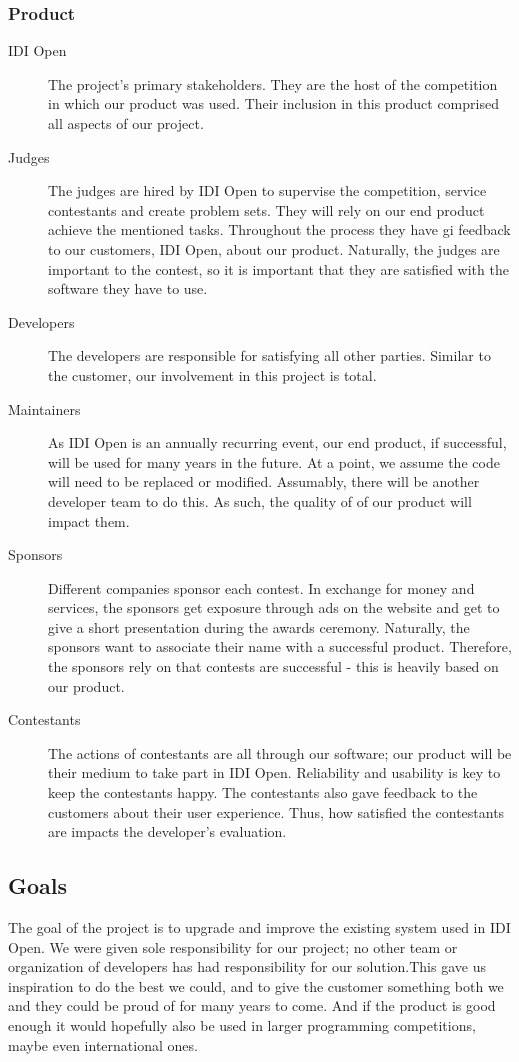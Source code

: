 \subsubsection{Product}
\begin{description}
\item[IDI Open]
The project's primary stakeholders. They are the host of
the competition in which our product was used. Their inclusion in this
product comprised all aspects of our project.

\item[Judges]
The judges are hired by IDI Open to supervise the competition, service
contestants and create problem sets. They will rely on our end product
achieve the mentioned tasks. Throughout the process they have gi\ven
feedback to our customers, IDI Open, about our product. Naturally, the
judges are important to the contest, so it is important that they are
satisfied with the software they have to use.

\item[Developers]
The developers are responsible for satisfying all other parties. Similar
to the customer, our involvement in this project is total.

\item[Maintainers]
As IDI Open is an annually recurring event, our end product, if
successful, will be used for many years in the future. At a point, we
assume the code will need to be replaced or modified. Assumably, there
will be another developer team to do this. As such, the quality of of
our product will impact them.

\item[Sponsors]
Different companies sponsor each contest. In exchange for money and
services, the sponsors get exposure through ads on the website and get
to give a short presentation during the awards ceremony. Naturally, the
sponsors want to associate their name with a successful product.
Therefore, the sponsors rely on that contests are successful - this is
heavily based on our product.

\item[Contestants]
The actions of contestants are all through our software; our product
will be their medium to take part in IDI Open. Reliability and
usability is key to keep the contestants happy. The contestants also
gave feedback to the customers about their user experience. Thus, how
satisfied the contestants are impacts the developer's
evaluation.
\end{description}

\subsection{Goals}
The goal of the project is to upgrade and improve the existing system
used in IDI Open. We were given sole responsibility for our project; no
other team or organization of developers has had responsibility for our
solution.This gave us inspiration to do the best we could, and to give
the customer something both we and they could be proud of for many
years to come. And if the product is good enough it would hopefully
also be used in larger programming competitions, maybe even
international ones.


